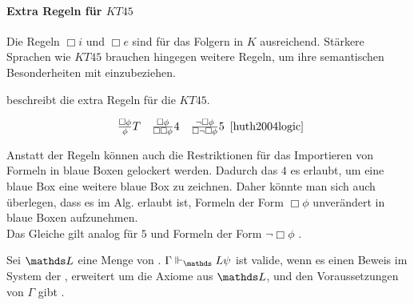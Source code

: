 \paragraph{Extra Regeln für $KT45$} %
\label{par:extra_regeln_fuer_kt45_}
Die Regeln $\Box i$ und $\Box e$ sind für das Folgern in $K$ ausreichend.
Stärkere Sprachen wie $KT45$ brauchen hingegen weitere Regeln, um ihre semantischen Besonderheiten mit einzubeziehen. 

 beschreibt die extra Regeln für die \ML $KT45$.

\begin{equation}
	\label{eq:kt45_deduc_rules}
	\begin{array}{ccc}
		\frac{\Box \phi}
		{\phi} T&
		
		\frac{\Box \phi}
		{\Box \Box \phi} 4&
		
		\frac{\neg \Box \phi}
		{\Box \neg \Box \phi} 5
	\end{array}
	\citeHuth{S. 330}
\end{equation}

Anstatt der Regeln können auch die Restriktionen für das Importieren von Formeln in blaue Boxen gelockert werden.
Dadurch das $4$ es erlaubt, um eine blaue Box eine weitere blaue Box zu zeichnen.
Daher könnte man sich auch überlegen, dass es im Alg. erlaubt ist, Formeln der Form $\Box \phi$ unverändert in blaue Boxen aufzunehmen.\\
Das Gleiche gilt analog für $5$ und Formeln der Form $\neg \Box \phi$ .

\begin{definition}
	Sei $\Menge{L}$ eine Menge von \formelSchemata. 
	$\Gamma
	\Vdash_\Menge{L} \psi$ ist valide, wenn es einen Beweis im 
	\ND System der 
	\NML, erweitert um die Axiome aus 
	$\Menge{L}$, und den Voraussetzungen von 
	$\Gamma$ gibt \cite[S.330]{huth2004logic}.
\end{definition}



